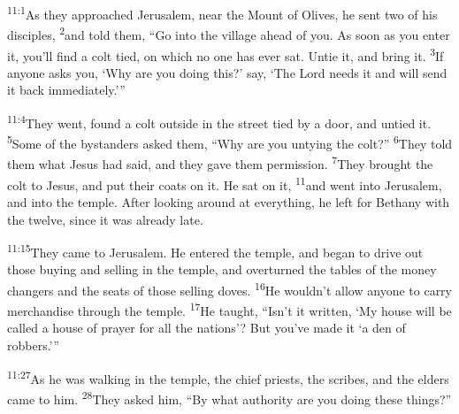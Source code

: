 \documentclass[openany,12pt,english]{book}
\newenvironment{para}{\par\pretolerance=100\tolerance=200\setlength{\emergencystretch}{0.6em}\relax}{\par}
\begin{document}
\bigskip{}

\begin{para}
    \textsuperscript{11:1}\thinspace{}As they approached Je\-ru\-sa\-lem, near the Mount of Olives, he sent two of his disciples,
    \textsuperscript{2}\thinspace{}and told them, “Go in\-to the vil\-lage a\-head of you. As soon as you en\-ter it, you'll find a colt tied, on which no one has ev\-er sat. Un\-tie it, and bring it.
    \textsuperscript{3}\thinspace{}If any\-one asks you, ‘Why are you do\-ing this?’ say, ‘The Lord needs it and will send it back im\-me\-di\-ate\-ly.’”
\end{para}

\begin{para}
    \textsuperscript{11:4}\thinspace{}They went, found a colt out\-side in the street tied by a door, and un\-tied it.
    \textsuperscript{5}\thinspace{}Some of the bystanders asked them, “Why are you un\-ty\-ing the colt?”
    \textsuperscript{6}\thinspace{}They told them what Jesus had said, and they gave them per\-mis\-sion.
    \textsuperscript{7}\thinspace{}They brought the colt to Jesus, and put their coats on it. He sat on it,
    \textsuperscript{11}\thinspace{}and went in\-to Je\-ru\-sa\-lem, and in\-to the tem\-ple. Af\-ter looking a\-round at eve\-ry\-thing, he left for Bethany with the twelve, since it was al\-read\-y late.
\end{para}

\bigskip{}

\begin{para}
    \textsuperscript{11:15}\thinspace{}They came to Je\-ru\-sa\-lem. He entered the tem\-ple, and be\-gan to drive out those buy\-ing and sell\-ing in the tem\-ple, and overturned the tables of the mon\-ey changers and the seats of those sell\-ing doves.
    \textsuperscript{16}\thinspace{}He would\-n't al\-low any\-one to car\-ry mer\-chan\-dise through the tem\-ple.
    \textsuperscript{17}\thinspace{}He taught, “Is\-n't it writ\-ten, ‘My house will be called a house of pray\-er for all the nations’? But you've made it ‘a den of robbers.’”
\end{para}

\bigskip{}

\begin{para}
    \textsuperscript{11:27}\thinspace{}As he was walk\-ing in the tem\-ple, the chief priests, the scribes, and the elders came to him.
    \textsuperscript{28}\thinspace{}They asked him, “By what au\-thor\-i\-ty are you do\-ing these things?”
\end{para}
\end{document}
